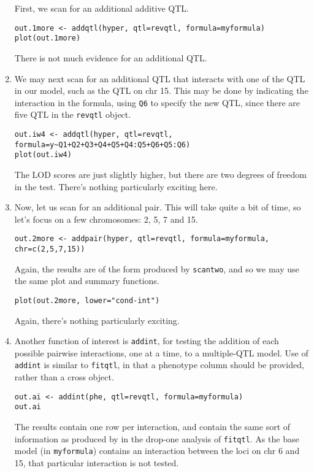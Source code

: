 \documentclass[10pt,letterpaper]{article}
\newcommand{\usercolor}{\color [named]{BlueViolet}}
\begin{document}
\begin{enumerate}
  First, we scan for an additional additive QTL.

\usercolor
\verb|out.1more <- addqtl(hyper, qtl=revqtl, formula=myformula)| \\
\verb|plot(out.1more)| 
\normalcolor

There is not much evidence for an additional QTL.

\item We may next scan for an additional QTL that interacts with one
  of the QTL in our model, such as the QTL on chr 15.  This may be done
  by indicating the interaction in the formula, using \verb-Q6- to
  specify the new QTL, since there are five QTL in the \verb-revqtl- object.

\usercolor
\verb|out.iw4 <- addqtl(hyper, qtl=revqtl, formula=y~Q1+Q2+Q3+Q4+Q5+Q4:Q5+Q6+Q5:Q6)| \\
\verb|plot(out.iw4)| 
\normalcolor

The LOD scores are just slightly higher, but there are two degrees of
freedom in the test.  There's nothing particularly exciting here.

\item Now, let us scan for an additional pair.  This will take
  quite a bit of time, so let's focus on a few chromosomes: 2, 5, 7
  and 15.

\usercolor
\verb|out.2more <- addpair(hyper, qtl=revqtl, formula=myformula, chr=c(2,5,7,15))| 
\normalcolor

Again, the results are of the form produced by \verb-scantwo-, and so
we may use the same plot and summary functions.

\usercolor
\verb|plot(out.2more, lower="cond-int")|
\normalcolor

Again, there's nothing particularly exciting.  

\item Another function of interest is \verb-addint-, for testing the
  addition of each possible pairwise interactions, one at a time, to a
  multiple-QTL model.  Use of \verb-addint- is similar to
  \verb-fitqtl-, in that a phenotype column should be provided, rather
  than a cross object.

\usercolor
\verb|out.ai <- addint(phe, qtl=revqtl, formula=myformula)| \\
\verb|out.ai|
\normalcolor

The results contain one row per interaction, and contain the same sort
of information as produced by in the drop-one analysis of
\verb-fitqtl-.  As the base model (in \verb-myformula-) contains an
interaction between the loci on chr 6 and 15, that particular
interaction is not tested.


\end{enumerate}
\end{document}
